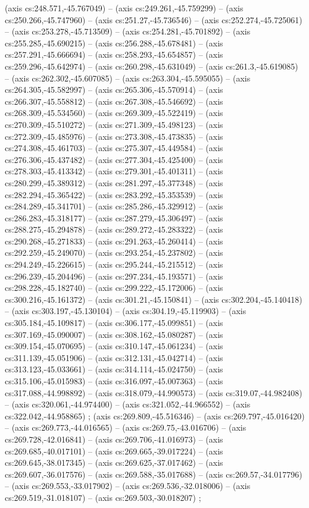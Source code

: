     (axis cs:248.571,-45.767049) --  (axis cs:249.261,-45.759299) --  (axis cs:250.266,-45.747960) --  (axis cs:251.27,-45.736546) --  (axis cs:252.274,-45.725061) --  (axis cs:253.278,-45.713509) --  (axis cs:254.281,-45.701892) --  (axis cs:255.285,-45.690215) --  (axis cs:256.288,-45.678481) --  (axis cs:257.291,-45.666694) --  (axis cs:258.293,-45.654857) --  (axis cs:259.296,-45.642974) --  (axis cs:260.298,-45.631049) --  (axis cs:261.3,-45.619085) --  (axis cs:262.302,-45.607085) --  (axis cs:263.304,-45.595055) --  (axis cs:264.305,-45.582997) --  (axis cs:265.306,-45.570914) --  (axis cs:266.307,-45.558812) --  (axis cs:267.308,-45.546692) --  (axis cs:268.309,-45.534560) --  (axis cs:269.309,-45.522419) --  (axis cs:270.309,-45.510272) --  (axis cs:271.309,-45.498123) --  (axis cs:272.309,-45.485976) --  (axis cs:273.308,-45.473835) --  (axis cs:274.308,-45.461703) --  (axis cs:275.307,-45.449584) --  (axis cs:276.306,-45.437482) --  (axis cs:277.304,-45.425400) --  (axis cs:278.303,-45.413342) --  (axis cs:279.301,-45.401311) --  (axis cs:280.299,-45.389312) --  (axis cs:281.297,-45.377348) --  (axis cs:282.294,-45.365422) --  (axis cs:283.292,-45.353539) --  (axis cs:284.289,-45.341701) --  (axis cs:285.286,-45.329912) --  (axis cs:286.283,-45.318177) --  (axis cs:287.279,-45.306497) --  (axis cs:288.275,-45.294878) --  (axis cs:289.272,-45.283322) --  (axis cs:290.268,-45.271833) --  (axis cs:291.263,-45.260414) --  (axis cs:292.259,-45.249070) --  (axis cs:293.254,-45.237802) --  (axis cs:294.249,-45.226615) --  (axis cs:295.244,-45.215512) --  (axis cs:296.239,-45.204496) --  (axis cs:297.234,-45.193571) --  (axis cs:298.228,-45.182740) --  (axis cs:299.222,-45.172006) --  (axis cs:300.216,-45.161372) --  (axis cs:301.21,-45.150841) --  (axis cs:302.204,-45.140418) --  (axis cs:303.197,-45.130104) --  (axis cs:304.19,-45.119903) --  (axis cs:305.184,-45.109817) --  (axis cs:306.177,-45.099851) --  (axis cs:307.169,-45.090007) --  (axis cs:308.162,-45.080287) --  (axis cs:309.154,-45.070695) --  (axis cs:310.147,-45.061234) --  (axis cs:311.139,-45.051906) --  (axis cs:312.131,-45.042714) --  (axis cs:313.123,-45.033661) --  (axis cs:314.114,-45.024750) --  (axis cs:315.106,-45.015983) --  (axis cs:316.097,-45.007363) --  (axis cs:317.088,-44.998892) --  (axis cs:318.079,-44.990573) --  (axis cs:319.07,-44.982408) --  (axis cs:320.061,-44.974400) --  (axis cs:321.052,-44.966552) --  (axis cs:322.042,-44.958865) ;
    (axis cs:269.809,-45.516346) --  (axis cs:269.797,-45.016420) --  (axis cs:269.773,-44.016565) --  (axis cs:269.75,-43.016706) --  (axis cs:269.728,-42.016841) --  (axis cs:269.706,-41.016973) --  (axis cs:269.685,-40.017101) --  (axis cs:269.665,-39.017224) --  (axis cs:269.645,-38.017345) --  (axis cs:269.625,-37.017462) --  (axis cs:269.607,-36.017576) --  (axis cs:269.588,-35.017688) --  (axis cs:269.57,-34.017796) --  (axis cs:269.553,-33.017902) --  (axis cs:269.536,-32.018006) --  (axis cs:269.519,-31.018107) --  (axis cs:269.503,-30.018207) ;
